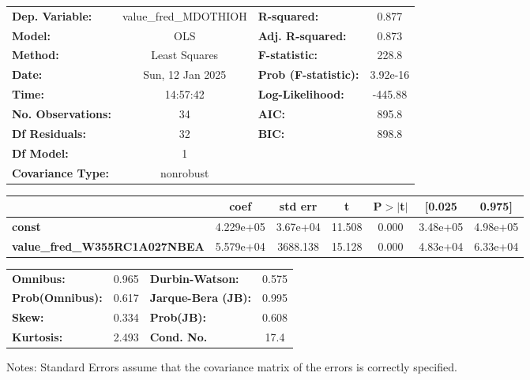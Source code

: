 \begin{center}
\begin{tabular}{lclc}
\toprule
\textbf{Dep. Variable:}               & value\_fred\_MDOTHIOH & \textbf{  R-squared:         } &     0.877   \\
\textbf{Model:}                       &          OLS          & \textbf{  Adj. R-squared:    } &     0.873   \\
\textbf{Method:}                      &     Least Squares     & \textbf{  F-statistic:       } &     228.8   \\
\textbf{Date:}                        &    Sun, 12 Jan 2025   & \textbf{  Prob (F-statistic):} &  3.92e-16   \\
\textbf{Time:}                        &        14:57:42       & \textbf{  Log-Likelihood:    } &   -445.88   \\
\textbf{No. Observations:}            &             34        & \textbf{  AIC:               } &     895.8   \\
\textbf{Df Residuals:}                &             32        & \textbf{  BIC:               } &     898.8   \\
\textbf{Df Model:}                    &              1        & \textbf{                     } &             \\
\textbf{Covariance Type:}             &       nonrobust       & \textbf{                     } &             \\
\bottomrule
\end{tabular}
\begin{tabular}{lcccccc}
                                      & \textbf{coef} & \textbf{std err} & \textbf{t} & \textbf{P$> |$t$|$} & \textbf{[0.025} & \textbf{0.975]}  \\
\midrule
\textbf{const}                        &    4.229e+05  &     3.67e+04     &    11.508  &         0.000        &     3.48e+05    &     4.98e+05     \\
\textbf{value\_fred\_W355RC1A027NBEA} &    5.579e+04  &     3688.138     &    15.128  &         0.000        &     4.83e+04    &     6.33e+04     \\
\bottomrule
\end{tabular}
\begin{tabular}{lclc}
\textbf{Omnibus:}       &  0.965 & \textbf{  Durbin-Watson:     } &    0.575  \\
\textbf{Prob(Omnibus):} &  0.617 & \textbf{  Jarque-Bera (JB):  } &    0.995  \\
\textbf{Skew:}          &  0.334 & \textbf{  Prob(JB):          } &    0.608  \\
\textbf{Kurtosis:}      &  2.493 & \textbf{  Cond. No.          } &     17.4  \\
\bottomrule
\end{tabular}
\end{center}

Notes: \newline
 [1] Standard Errors assume that the covariance matrix of the errors is correctly specified.